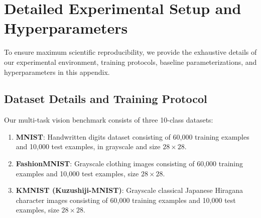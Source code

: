 \documentclass{article}
\theoremstyle{plain}
\theoremstyle{definition}
\theoremstyle{remark}
\begin{document}
\newpage



\newpage
\appendix
\onecolumn

\section{Detailed Experimental Setup and Hyperparameters}
\label{app:experiments}

To ensure maximum scientific reproducibility, we provide the exhaustive details of our experimental environment, training protocols, baseline parameterizations, and hyperparameters in this appendix.

\subsection{Dataset Details and Training Protocol}
Our multi-task vision benchmark consists of three 10-class datasets:
\begin{enumerate}
    \item \textbf{MNIST}: Handwritten digits dataset consisting of 60,000 training examples and 10,000 test examples, in grayscale and size $28 \times 28$.
    \item \textbf{FashionMNIST}: Grayscale clothing images consisting of 60,000 training examples and 10,000 test examples, size $28 \times 28$.
    \item \textbf{KMNIST (Kuzushiji-MNIST)}: Grayscale classical Japanese Hiragana character images consisting of 60,000 training examples and 10,000 test examples, size $28 \times 28$.
\end{enumerate}
\end{document}
